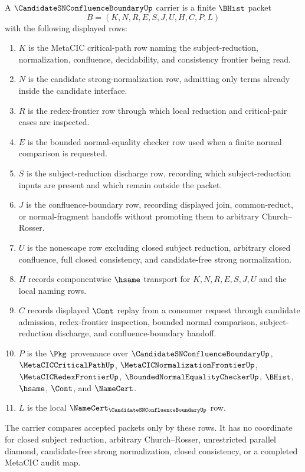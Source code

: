 \begin{definition}
\label{def:candidate-sn-confluence-boundary-carrier}
A $\CandidateSNConfluenceBoundaryUp$ carrier is a finite $\BHist$ packet
$$
B=(K,N,R,E,S,J,U,H,C,P,L)
$$
with the following displayed rows:
\begin{enumerate}
\item $K$ is the MetaCIC critical-path row naming the subject-reduction, normalization, confluence, decidability, and consistency frontier being read.
\item $N$ is the candidate strong-normalization row, admitting only terms already inside the candidate interface.
\item $R$ is the redex-frontier row through which local reduction and critical-pair cases are inspected.
\item $E$ is the bounded normal-equality checker row used when a finite normal comparison is requested.
\item $S$ is the subject-reduction discharge row, recording which subject-reduction inputs are present and which remain outside the packet.
\item $J$ is the confluence-boundary row, recording displayed join, common-reduct, or normal-fragment handoffs without promoting them to arbitrary Church--Rosser.
\item $U$ is the nonescape row excluding closed subject reduction, arbitrary closed confluence, full closed consistency, and candidate-free strong normalization.
\item $H$ records componentwise $\hsame$ transport for $K,N,R,E,S,J,U$ and the local naming rows.
\item $C$ records displayed $\Cont$ replay from a consumer request through candidate admission, redex-frontier inspection, bounded normal comparison, subject-reduction discharge, and confluence-boundary handoff.
\item $P$ is the $\Pkg$ provenance over $\CandidateSNConfluenceBoundaryUp$, $\MetaCICCriticalPathUp$, $\MetaCICNormalizationFrontierUp$, $\MetaCICRedexFrontierUp$, $\BoundedNormalEqualityCheckerUp$, $\BHist$, $\hsame$, $\Cont$, and $\NameCert$.
\item $L$ is the local $\NameCert_{\CandidateSNConfluenceBoundaryUp}$ row.
\end{enumerate}
The carrier compares accepted packets only by these rows. It has no coordinate for closed subject reduction, arbitrary Church--Rosser, unrestricted parallel diamond, candidate-free strong normalization, closed consistency, or a completed MetaCIC audit map.
\end{definition}

